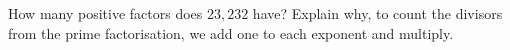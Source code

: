 How many positive factors does $23{,}232$ have? Explain why, to count the divisors from the prime factorisation, we add one to each exponent and multiply.
